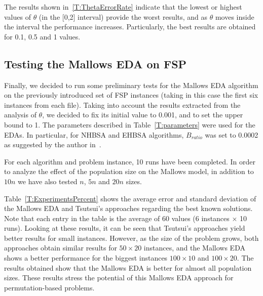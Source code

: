 \documentclass[runningheads]{llncs}
\begin{document}
The results shown in~\ref{T:ThetaErrorRate} indicate that the lowest or highest values of $\theta$ (in the [0,2] interval) provide the worst results, and as $\theta$ moves inside the interval the performance increases. Particularly, the best results are obtained for 0.1, 0.5 and 1 values.

\subsection{Testing the Mallows EDA on FSP}

Finally, we decided to run some preliminary tests for the Mallows EDA algorithm on the previously introduced set of FSP instances (taking in this case the first six instances from each file).
Taking into account the results extracted from the analysis of $\theta$, we decided to fix its initial value to 0.001, and to set the upper bound to 1. The parameters described in Table~\ref{T:parameters} were used for the EDAs. In particular, for NHBSA and EHBSA algorithms, $B_{ratio}$ was set to 0.0002 as suggested by the author in~\cite{Tsutsui06nodehistogram}.

For each algorithm and problem instance, 10 runs have been completed. In order to analyze the effect of the population size on the Mallows model, in addition to $10n$ we have also tested $n$, $5n$ and $20n$ sizes.

Table~\ref{T:ExperimentsPercent} shows the average error and standard deviation of the Mallows EDA and Tsutsui's approaches regarding the best known solutions. Note that each entry in the table is the average of 60 values (6 instances $\times$ 10 runs). Looking at these results, it can be seen that Tsutsui's approaches yield better results for small instances. However, as the size of the problem grows, both approaches obtain similar results for $50\times20$ instances, and the Mallows EDA shows a better performance for the biggest instances $100\times10$ and $100\times20$. The results obtained show that the Mallows EDA is better for almost all population sizes. These results stress the potential of this Mallows EDA approach for permutation-based problems.
\end{document}
